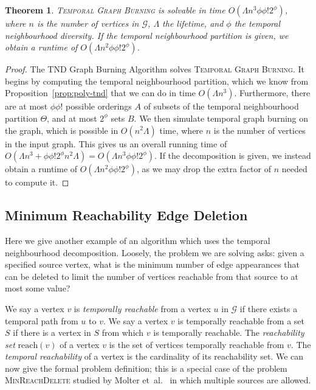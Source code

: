 \documentclass[preprint,12pt]{elsarticle}
\newtheorem{theorem}{Theorem}
\begin{document}
\begin{theorem}
    \textsc{Temporal Graph Burning} is solvable in time $O(\Lambda n^3\phi\phi!2^\phi)$, where $n$ is the number of vertices in $\mathcal{G}$, $\Lambda$ the lifetime, and $\phi$ the temporal neighbourhood diversity. If the temporal neighbourhood partition is given, we obtain a runtime of $O(\Lambda n^2\phi\phi!2^\phi)$.
\end{theorem}
\begin{proof}
    The TND Graph Burning Algorithm solves \textsc{Temporal Graph Burning}. It begins by computing the temporal neighbourhood partition, which we know from Proposition~\ref{prop:poly-tnd} that we can do in time $O(\Lambda n^3)$. Furthermore, there are at most $\phi\phi!$ possible orderings $A$ of subsets of the temporal neighbourhood partition $\Theta$, and at most $2^\phi$ sets $B$. We then simulate temporal graph burning on the graph, which is possible in $O(n^2\Lambda)$ time, where $n$ is the number of vertices in the input graph. This gives us an overall running time of $O(\Lambda n^3 + \phi\phi!2^\phi n^2\Lambda)=O(\Lambda n^3\phi\phi!2^\phi)$. If the decomposition is given, we instead obtain a runtime of $O(\Lambda n^2\phi\phi!2^\phi)$, as we may drop the extra factor of $n$ needed to compute it.
\end{proof}

\subsection{Minimum Reachability Edge Deletion}\label{sec:min-edge-del}
Here we give another example of an algorithm which uses the temporal neighbourhood decomposition.  Loosely, the problem we are solving asks: given a specified source vertex, what is the minimum number of edge appearances that can be deleted to limit the number of vertices reachable from that source to at most some value?

We say a vertex $v$ is \emph{temporally reachable} from a vertex $u$ in $\mathcal{G}$ if there exists a temporal path from $u$ to $v$. We say a vertex $v$ is temporally reachable from a set $S$ if there is a vertex in $S$ from which $v$ is temporally reachable. The \emph{reachability set} $\text{reach}(v)$ of a vertex $v$ is the set of vertices temporally reachable from $v$. The \emph{temporal reachability} of a vertex is the cardinality of its reachability set.
We can now give the formal problem definition; this is a special case of the problem \textsc{MinReachDelete} studied by Molter et~al.~\cite{molter_temporal_2021} in which multiple sources are allowed.
\end{document}
